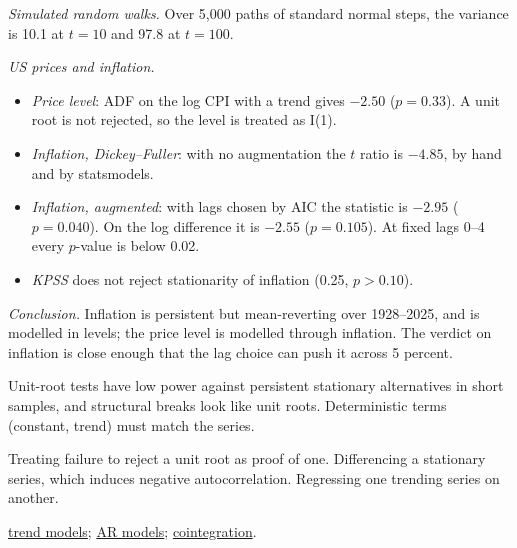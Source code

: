 \begin{qfdefinition}
 \emph{Simulated random walks.} Over 5,000 paths of standard normal steps, the variance is 10.1 at $t=10$ and 97.8 at $t=100$.

\emph{US prices and inflation.}
\begin{itemize}
\item \emph{Price level}: ADF on the log CPI with a trend gives $-2.50$ ($p=0.33$). A unit root is not rejected, so the level is treated as I(1).
\item \emph{Inflation, Dickey--Fuller}: with no augmentation the $t$ ratio is $-4.85$, by hand and by statsmodels.
\item \emph{Inflation, augmented}: with lags chosen by AIC the statistic is $-2.95$ ($p=0.040$). On the log difference it is $-2.55$ ($p=0.105$). At fixed lags 0--4 every $p$-value is below 0.02.
\item \emph{KPSS} does not reject stationarity of inflation (0.25, $p>0.10$).
\end{itemize}
\emph{Conclusion.} Inflation is persistent but mean-reverting over 1928--2025, and is modelled in levels; the price level is modelled through inflation. The verdict on inflation is close enough that the lag choice can push it across 5 percent.

 Unit-root tests have low power against persistent stationary alternatives in short samples, and structural breaks look like unit roots. Deterministic terms (constant, trend) must match the series.

 Treating failure to reject a unit root as proof of one. Differencing a stationary series, which induces negative autocorrelation. Regressing one trending series on another.

 \hyperref[meth:trend-models]{trend models}; \hyperref[meth:autoregressive-forecasting]{AR models}; \hyperref[meth:cointegration-testing]{cointegration}.

\end{qfdefinition}


